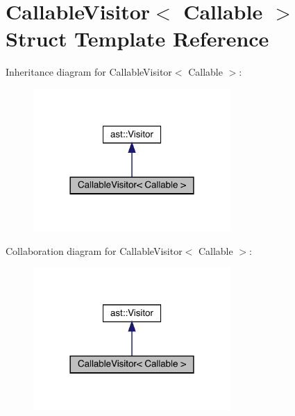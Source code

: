\hypertarget{struct_callable_visitor}{}\section{Callable\+Visitor$<$ Callable $>$ Struct Template Reference}
\label{struct_callable_visitor}


Inheritance diagram for Callable\+Visitor$<$ Callable $>$\+:\nopagebreak
\begin{figure}[H]
\begin{center}
\leavevmode
\includegraphics[width=213pt]{struct_callable_visitor__inherit__graph}
\end{center}
\end{figure}


Collaboration diagram for Callable\+Visitor$<$ Callable $>$\+:\nopagebreak
\begin{figure}[H]
\begin{center}
\leavevmode
\includegraphics[width=213pt]{struct_callable_visitor__coll__graph}
\end{center}
\end{figure}
